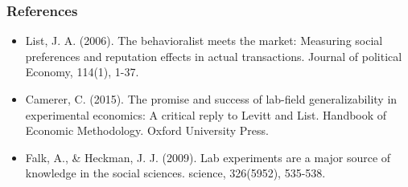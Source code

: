 \documentclass{beamer}
\begin{document}
\begin{frame}
	\frametitle{References}
	\begin{itemize}
		\item List, J. A. (2006). The behavioralist meets the market: Measuring social preferences and reputation effects in actual transactions. Journal of political Economy, 114(1), 1-37.
		\item Camerer, C. (2015). The promise and success of lab-field generalizability in experimental economics: A critical reply to Levitt and List. Handbook of Economic Methodology. Oxford University Press.
		\item Falk, A., \& Heckman, J. J. (2009). Lab experiments are a major source of knowledge in the social sciences. science, 326(5952), 535-538.
	\end{itemize}
	
\end{frame}
\end{document}
